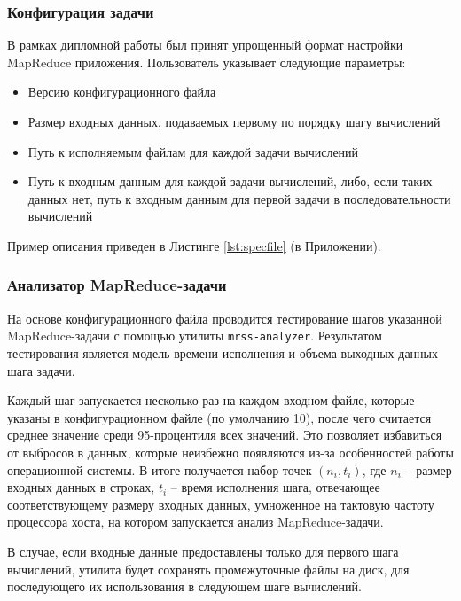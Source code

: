 \documentclass[../diploma.tex]{subfile}
\begin{document}
    \subsubsection{Конфигурация задачи}

    В рамках дипломной работы был принят упрощенный формат настройки MapReduce
    приложения. Пользователь указывает следующие параметры:
    
    \begin{itemize}
        \item Версию конфигурационного файла
        \item Размер входных данных, подаваемых первому по порядку шагу вычислений
        \item Путь к исполняемым файлам для каждой задачи вычислений
        \item Путь к входным данным для каждой задачи вычислений, либо, если
              таких данных нет, путь к входным данным для первой задачи в
              последовательности вычислений
    \end{itemize}

    Пример описания приведен в Листинге \ref{lst:specfile} (в Приложении). 
    
    \subsubsection{Анализатор MapReduce-задачи}

    На основе конфигурационного файла проводится тестирование шагов указанной
    MapReduce\hyp{}задачи с помощью утилиты {\tt mrss-analyzer}. Результатом
    тестирования является модель времени исполнения и объема выходных данных
    шага задачи.

    Каждый шаг запускается несколько раз на каждом входном файле, которые
    указаны в конфигурационном файле (по умолчанию 10), после чего считается
    среднее значение среди 95-процентиля всех значений. Это позволяет избавиться
    от выбросов в данных, которые неизбежно появляются из-за особенностей работы
    операционной системы. В итоге получается набор точек $(n_i, t_i)$, где $n_i$
    -- размер входных данных в строках, $t_i$ -- время исполнения шага,
    отвечающее соответствующему размеру входных данных, умноженное на тактовую 
    частоту процессора хоста, на котором запускается анализ MapReduce-задачи.

    В случае, если входные данные предоставлены только для первого шага
    вычислений, утилита будет сохранять промежуточные файлы на диск, для
    последующего их использования в следующем шаге вычислений.
    
\end{document}
